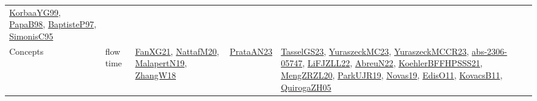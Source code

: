 {\begin{longtable}{lp{3cm}>{\raggedright}p{6cm}>{\raggedright}p{6cm}p{8cm}}
\href{papers/KorbaaYG99.pdf}{KorbaaYG99}\cite{KorbaaYG99}, \href{articles/PapaB98.pdf}{PapaB98}\cite{PapaB98}, \href{papers/BaptisteP97.pdf}{BaptisteP97}\cite{BaptisteP97}, \href{papers/SimonisC95.pdf}{SimonisC95}\cite{SimonisC95}\\
Concepts & flow time & \href{articles/FanXG21.pdf}{FanXG21}\cite{FanXG21}, \href{papers/NattafM20.pdf}{NattafM20}\cite{NattafM20}, \href{papers/MalapertN19.pdf}{MalapertN19}\cite{MalapertN19}, \href{articles/ZhangW18.pdf}{ZhangW18}\cite{ZhangW18} & \href{articles/PrataAN23.pdf}{PrataAN23}\cite{PrataAN23} & \href{papers/TasselGS23.pdf}{TasselGS23}\cite{TasselGS23}, \href{papers/YuraszeckMC23.pdf}{YuraszeckMC23}\cite{YuraszeckMC23}, \href{articles/YuraszeckMCCR23.pdf}{YuraszeckMCCR23}\cite{YuraszeckMCCR23}, \href{articles/abs-2306-05747.pdf}{abs-2306-05747}\cite{abs-2306-05747}, \href{papers/LiFJZLL22.pdf}{LiFJZLL22}\cite{LiFJZLL22}, \href{articles/AbreuN22.pdf}{AbreuN22}\cite{AbreuN22}, \href{articles/KoehlerBFFHPSSS21.pdf}{KoehlerBFFHPSSS21}\cite{KoehlerBFFHPSSS21}, \href{articles/MengZRZL20.pdf}{MengZRZL20}\cite{MengZRZL20}, \href{papers/ParkUJR19.pdf}{ParkUJR19}\cite{ParkUJR19}, \href{articles/Novas19.pdf}{Novas19}\cite{Novas19}, \href{papers/EdisO11.pdf}{EdisO11}\cite{EdisO11}, \href{articles/KovacsB11.pdf}{KovacsB11}\cite{KovacsB11}, \href{papers/QuirogaZH05.pdf}{QuirogaZH05}\cite{QuirogaZH05}\\

\end{longtable}}
